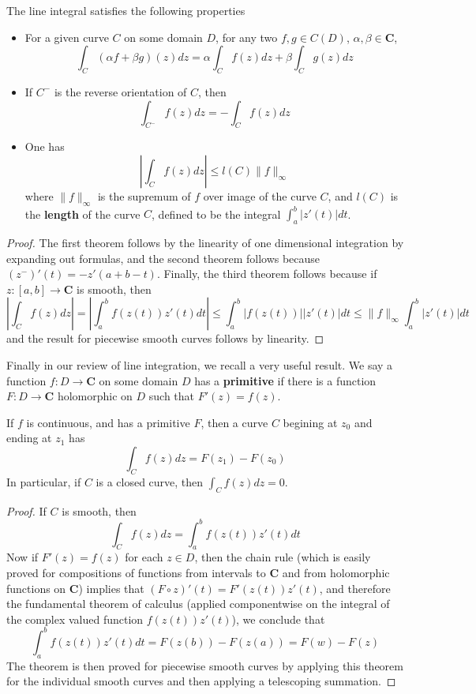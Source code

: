 \begin{theorem}
    The line integral satisfies the following properties
    \begin{itemize}
        \item For a given curve $C$ on some domain $D$, for any two $f,g \in C(D)$, $\alpha, \beta \in \mathbf{C}$,
        \[ \int_C (\alpha f + \beta g)(z) dz = \alpha \int_C f(z) dz + \beta \int_C g(z) dz \]

        \item If $C^-$ is the reverse orientation of $C$, then
        \[ \int_{C^-} f(z) dz = - \int_C f(z) dz \]

        \item One has
        \[ \left| \int_C f(z) dz \right| \leq l(C) \| f \|_\infty \]
        where $\| f \|_\infty$ is the supremum of $f$ over image of the curve $C$, and $l(C)$ is the {\bf length} of the curve $C$, defined to be the integral $\int_a^b |z'(t)| dt$.
    \end{itemize}
\end{theorem}
\begin{proof}
    The first theorem follows by the linearity of one dimensional integration by expanding out formulas, and the second theorem follows because $(z^-)'(t) = -z'(a+b-t)$. Finally, the third theorem follows because if $z: [a,b] \to \mathbf{C}$ is smooth, then
    \[ \left| \int_C f(z)dz \right| = \left| \int_a^b f(z(t)) z'(t) dt \right| \leq \int_a^b |f(z(t))||z'(t)| dt \leq \| f \|_\infty \int_a^b |z'(t)| dt \]
    and the result for piecewise smooth curves follows by linearity.
\end{proof}

Finally in our review of line integration, we recall a very useful result. We say a function $f: D \to \mathbf{C}$ on some domain $D$ has a {\bf primitive} if there is a function $F: D \to \mathbf{C}$ holomorphic on $D$ such that $F'(z) = f(z)$.

\begin{theorem}
    If $f$ is continuous, and has a primitive $F$, then a curve $C$ begining at $z_0$ and ending at $z_1$ has
    \[ \int_C f(z)dz = F(z_1) - F(z_0) \]
    In particular, if $C$ is a closed curve, then $\int_C f(z)dz = 0$.
\end{theorem}
\begin{proof}
    If $C$ is smooth, then
    \[ \int_C f(z)dz = \int_a^b f(z(t)) z'(t) dt \]
    Now if $F'(z) = f(z)$ for each $z \in D$, then the chain rule (which is easily proved for compositions of functions from intervals to $\mathbf{C}$ and from holomorphic functions on $\mathbf{C}$) implies that $(F \circ z)'(t) = F'(z(t)) z'(t)$, and therefore the fundamental theorem of calculus (applied componentwise on the integral of the complex valued function $f(z(t)) z'(t)$), we conclude that
    \[ \int_a^b f(z(t)) z'(t) dt = F(z(b)) - F(z(a)) = F(w) - F(z) \]
    The theorem is then proved for piecewise smooth curves by applying this theorem for the individual smooth curves and then applying a telescoping summation.
\end{proof}

